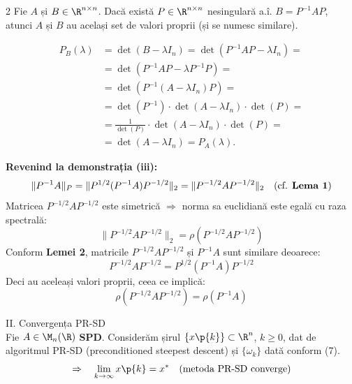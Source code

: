 \begin{demonstratie}
    \bigskip

    \begin{lema}{2}
        Fie $A$ și $B \in \R^{n \times n}$. Dacă există $P \in \R^{n \times n}$ nesingulară a.î. $B = P^{-1}AP$, atunci $A$ și $B$ au același set de valori proprii (și se numesc similare).
    \end{lema}

    \begin{demonstratie}
        \begin{align*}
            P_B(\lambda) &= \det(B - \lambda I_n) = \det(P^{-1}AP - \lambda I_n) = \\
            &= \det(P^{-1}AP - \lambda P^{-1}P) = \\
            &= \det(P^{-1}(A - \lambda I_n)P) = \\
            &= \det(P^{-1}) \cdot \det(A - \lambda I_n) \cdot \det(P) = \\
            &= \frac{1}{\det(P)} \cdot \det(A - \lambda I_n) \cdot \det(P) = \\
            &= \det(A - \lambda I_n) = P_A(\lambda). 
        \end{align*}
    \end{demonstratie}

    \bigskip

    \textbf{Revenind la demonstrația (iii):}
    $$
    \| P^{-1} A \|_P = \| P^{1/2} (P^{-1} A) P^{-1/2} \|_2 = \| P^{-1/2} A P^{-1/2} \|_2 \quad (\text{cf. \textbf{Lema 1}})
    $$
    Matricea $P^{-1/2} A P^{-1/2}$ este simetrică $\Rightarrow$ norma sa euclidiană este egală cu raza spectrală:
    $$
    \| P^{-1/2} A P^{-1/2} \|_2 = \rho(P^{-1/2} A P^{-1/2})
    $$
    Conform \textbf{Lemei 2}, matricile $P^{-1/2} A P^{-1/2}$ și $P^{-1} A$ sunt similare deoarece:
    $$
    P^{-1/2} A P^{-1/2} = P^{1/2} (P^{-1} A) P^{-1/2}
    $$
    Deci au aceleași valori proprii, ceea ce implică:
    $$
    \rho(P^{-1/2} A P^{-1/2}) = \rho(P^{-1} A) 
    $$

\end{demonstratie}

\begin{teorema}{II. Convergența PR-SD}
    \text{ }\\[0.5em]
    Fie $A \in \M_n(\R)$ \textbf{SPD}. Considerăm șirul $\{x\p{k}\} \subset \R^n$, $k \ge 0$, dat de algoritmul PR-SD (preconditioned steepest descent) și $\{\omega_k\}$ dată conform (7).
    $$
    \Rightarrow \quad \lim_{k \to \infty} x\p{k} = x^\ast \quad\text{(metoda PR-SD converge)}
    $$
\end{teorema}

